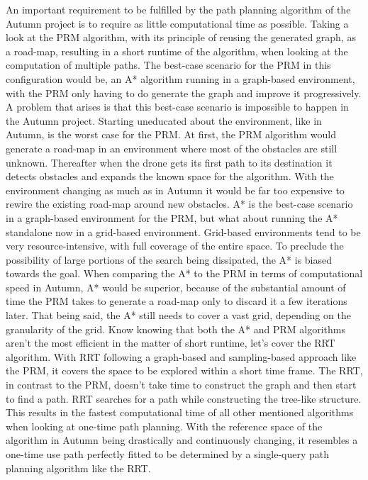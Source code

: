An important requirement to be fulfilled by the path planning algorithm of the Autumn project is to require as little computational time as possible. Taking a look at the PRM algorithm, with its principle of reusing the generated graph, as a road-map, resulting in a short runtime of the algorithm, when looking at the computation of multiple paths. The best-case scenario for the PRM in this configuration would be, an A* algorithm running in a graph-based environment, with the PRM only having to do generate the graph and improve it progressively. A problem that arises is that this best-case scenario is impossible to happen in the Autumn project. Starting uneducated about the environment, like in Autumn, is the worst case for the PRM. At first, the PRM algorithm would generate a road-map in an environment where most of the obstacles are still unknown. Thereafter when the drone gets its first path to its destination it detects obstacles and expands the known space for the algorithm. With the environment changing as much as in Autumn it would be far too expensive to rewire the existing road-map around new obstacles. A* is the best-case scenario in a graph-based environment for the PRM, but what about running the A* standalone now in a grid-based environment. Grid-based environments tend to be very resource-intensive, with full coverage of the entire space. To preclude the possibility of large portions of the search being dissipated, the A* is biased towards the goal. When comparing the A* to the PRM in terms of computational speed in Autumn, A* would be superior, because of the substantial amount of time the PRM takes to generate a road-map only to discard it a few iterations later. That being said, the A* still needs to cover a vast grid, depending on the granularity of the grid. Know knowing that both the A* and PRM algorithms aren't the most efficient in the matter of short runtime, let's cover the RRT algorithm. With RRT following a graph-based and sampling-based approach like the PRM, it covers the space to be explored within a short time frame. The RRT, in contrast to the PRM, doesn't take time to construct the graph and then start to find a path. RRT searches for a path while constructing the tree-like structure. This results in the fastest computational time of all other mentioned algorithms when looking at one-time path planning. With the reference space of the algorithm in Autumn being drastically and continuously changing, it resembles a one-time use path perfectly fitted to be determined by a single-query path planning algorithm like the RRT.

